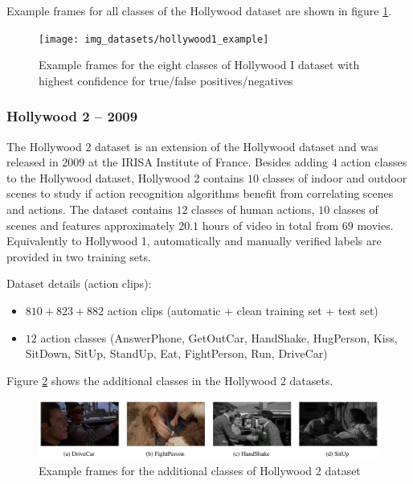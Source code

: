 Example frames for all classes of the Hollywood dataset are shown in figure \ref{fig:hollywood1_example}.

\begin{figure}[H]
    \centering
    \texttt{[image: img\_datasets/hollywood1\_example]}
    \caption{Example frames for the eight classes of Hollywood I dataset with highest confidence for true/false positives/negatives \cite{laptev_learning_2008}}
    \label{fig:hollywood1_example}
\end{figure}


\subsubsection{Hollywood 2 -- 2009}
The Hollywood 2 dataset \cite{marszalek_actions_2009} is an extension of the Hollywood dataset and was released in 2009 at the IRISA Institute of France.
Besides adding $4$ action classes to the Hollywood dataset, Hollywood 2 contains $10$ classes of indoor and outdoor scenes to study if action recognition algorithms benefit from correlating scenes and actions.
The dataset contains $12$ classes of human actions, $10$ classes of scenes and features approximately $20.1$ hours of video in total from $69$ movies.
Equivalently to Hollywood 1, automatically and manually verified labels are provided in two training sets.

Dataset details (action clips): \cite{_ivan_????-1}
\begin{itemize}
    \item $810 + 823 + 882$ action clips (automatic + clean training set + test set)
    \item $12$ action classes (AnswerPhone, GetOutCar, HandShake, HugPerson, Kiss, SitDown, SitUp, StandUp, Eat, FightPerson, Run, DriveCar)
\end{itemize}

Figure \ref{fig:hollywood2_example} shows the additional classes in the Hollywood 2 datasets.

\begin{figure}[H]
    \centering
    \includegraphics[width=\textwidth]{img_datasets/hollywood2_example}
    \caption{Example frames for the additional classes of Hollywood 2 dataset \cite{marszalek_actions_2009}}
    \label{fig:hollywood2_example}
\end{figure}


